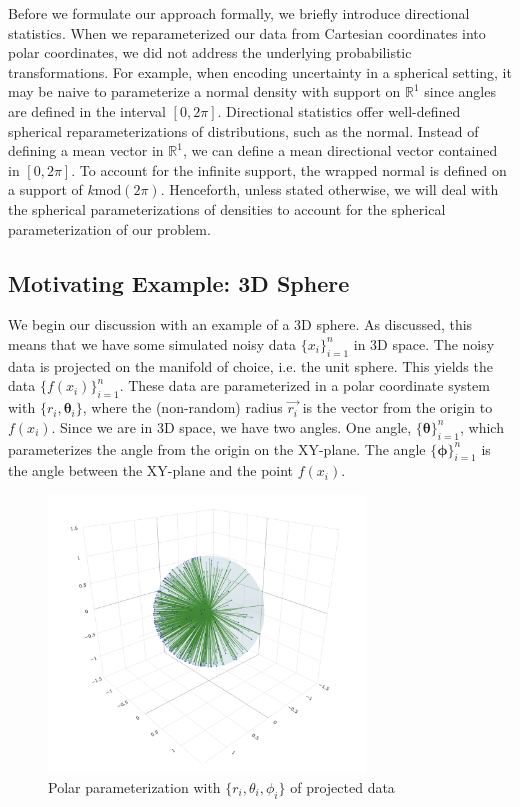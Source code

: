 \documentclass[twoside,11pt]{article}
\begin{document}
Before we formulate our approach formally, we briefly introduce directional statistics. When we reparameterized our data from Cartesian coordinates into polar coordinates, we did not address the underlying probabilistic transformations. For example, when encoding uncertainty in a spherical setting, it may be naive to parameterize a normal density with support on $\mathbb{R}^1$ since angles are defined in the interval $[0, 2\pi]$. Directional statistics offer well-defined spherical reparameterizations of distributions, such as the normal. Instead of defining a mean vector in $\mathbb{R}^1$, we can define a mean directional vector contained in $[0, 2\pi]$. To account for the infinite support, the wrapped normal is defined on a support of $k\text{mod}(2\pi)$. Henceforth, unless stated otherwise, we will deal with the spherical parameterizations of densities to account for the spherical parameterization of our problem. 

\subsection{Motivating Example: 3D Sphere}

We begin our discussion with an example of a 3D sphere. As discussed, this means that we have some simulated noisy data $\{x_i\}_{i=1}^n$ in 3D space. The noisy data is projected on the manifold of choice, i.e. the unit sphere. This yields the data $\{f(x_i)\}_{i=1}^n$. These data are parameterized in a polar coordinate system with $\{r_i, \mathbf{\theta}_i\}$, where the (non-random) radius $\vec{r_i}$ is the vector from the origin to $f(x_i)$. Since we are in 3D space, we have two angles. One angle, $\{\mathbf{\theta}\}_{i=1}^n$, which parameterizes the angle from the origin on the XY-plane. The angle $\{\mathbf{\phi}\}_{i=1}^n$ is the angle between the XY-plane and the point $f(x_i)$. 

\begin{figure}
  \begin{center}
    \includegraphics[width=0.75\textwidth]{../fig/projections-from-origin.png}
  \end{center}
  \caption{Polar parameterization with $\{r_i, \theta_i, \phi_i\}$ of projected data}\label{fig:projections-from-origin}
\end{figure}
\end{document}
